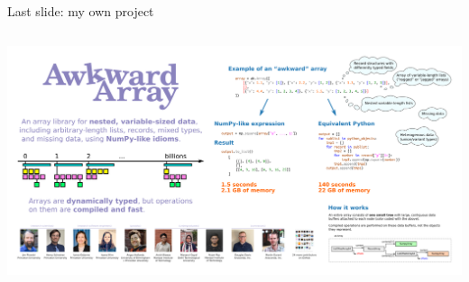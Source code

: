 \documentclass[aspectratio=169]{beamer}
\begin{document}
\begin{frame}{Last slide: my own project}
\begin{columns}
\includegraphics[width=\linewidth]{PLOTS/awkward-array-elevator-pitch.pdf}
\end{columns}
\end{frame}
\end{document}
